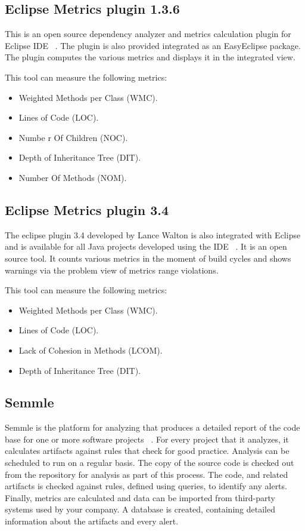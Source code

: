 \subsection{Eclipse Metrics plugin 1.3.6}

This is an open source dependency analyzer and metrics calculation plugin for Eclipse IDE ~\cite{ecl}. The plugin is also provided integrated as an EasyEclipse package. The plugin computes the various metrics and displays it in the integrated view.


This tool can measure the following metrics:

\begin{itemize}
	\item Weighted Methods per Class (WMC).
	\item Lines of Code (LOC). 
	\item Numbe r Of Children (NOC).
	\item Depth of Inheritance Tree (DIT).
    \item Number Of Methods (NOM).
\end{itemize}

\subsection{Eclipse Metrics plugin 3.4}
The eclipse plugin 3.4 developed by Lance Walton is also integrated with Eclipse and is available for all Java projects developed using the IDE ~\cite{ecl1}. It is an open source tool. It counts various metrics in the moment of build cycles and shows warnings via the problem view of metrics range violations.

This tool can measure the following metrics:
\begin{itemize}
	\item Weighted Methods per Class (WMC).
	\item Lines of Code (LOC). 
	\item Lack of Cohesion in Methods (LCOM).
	\item Depth of Inheritance Tree (DIT).
\end{itemize}

\subsection{Semmle}

Semmle is the platform for analyzing that produces a detailed report of the code base for one or more software projects ~\cite{semmle}. For every project that it analyzes, it calculates artifacts against rules that check for good practice. Analysis can be scheduled to run on a regular basis. The copy of the source code is checked out from the repository for analysis as part of this process. The code, and related artifacts is checked against rules, defined using queries, to identify any alerts. Finally, metrics are calculated and data can be imported from third-party systems used by your company. A database is created, containing detailed information about the artifacts and every alert.


